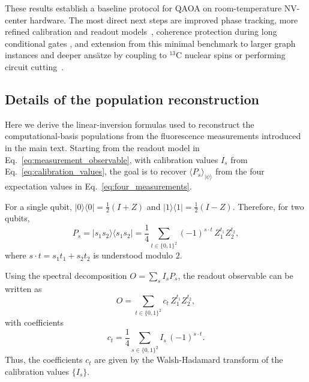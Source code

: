 \documentclass[conference]{IEEEtran}
\begin{document}
These results establish a baseline protocol for QAOA on room-temperature NV-
center hardware. The most direct next steps are improved phase tracking, more
refined calibration and readout models~\cite{he2024direct}, coherence protection
during long conditional gates \cite{taminiau_universal_2014}, and extension from
this minimal benchmark to larger graph instances and deeper ansätze by coupling
to \({}^{13}\mathrm{C}\) nuclear spins or performing circuit
cutting~\cite{Mitarai_2021}.

\begin{appendices}

\section{Details of the population reconstruction}%
\label{app:population_reconstruction}

Here we derive the linear-inversion formulas used to reconstruct the
computational-basis populations from the fluorescence measurements introduced in
the main text. Starting from the readout model in
Eq.~\eqref{eq:measurement_observable}, with calibration values \(I_s\) from
Eq.~\eqref{eq:calibration_values}, the goal is to recover \(\langle
P_s\rangle_{|\psi\rangle}\) from the four expectation values in
Eq.~\eqref{eq:four_measurements}.

For a single qubit, \(|0\rangle\langle 0|=\frac{1}{2}(I+Z)\) and \(
|1\rangle\langle 1|=\frac{1}{2}(I-Z)\). Therefore, for two qubits,
\begin{equation}
P_s = |s_1s_2\rangle\langle s_1s_2|
= \frac{1}{4} \sum_{t\in\{0,1\}^2} (-1)^{s\cdot t}\, Z_1^{t_1}Z_2^{t_2},
\label{eq:appendix_projector_expansion}
\end{equation}
where \(s\cdot t=s_1t_1+s_2t_2\) is understood modulo \(2\).

Using the spectral decomposition \(O=\sum_s I_s P_s\), the readout observable
can be written as
\begin{equation}
O = \sum_{t\in\{0,1\}^2} c_t\, Z_1^{t_1}Z_2^{t_2},
\label{eq:appendix_O_Z_expansion}
\end{equation}
with coefficients
\begin{equation}
c_t = \frac{1}{4} \sum_{s\in\{0,1\}^2} I_s\,(-1)^{s\cdot t}.
\label{eq:appendix_ct}
\end{equation}
Thus, the coefficients \(c_t\) are given by the Walsh-Hadamard transform of the
calibration values \(\{I_s\}\).


\end{appendices}
\end{document}
